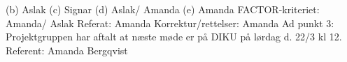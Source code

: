 \documentclass[a4paper,12pt]{article}
\begin{document}
(b) Aslak
\newline
\newline
(c) Signar 
\newline
\newline
(d) Aslak/ Amanda
\newline
\newline
(e) Amanda
\newline
\newline
FACTOR-kriteriet: Amanda/ Aslak
\newline
\newline
Referat: Amanda
\newline
\newline
Korrektur/rettelser: Amanda
\newline
\newline
Ad punkt 3: Projektgruppen har aftalt at næste møde er på DIKU på lørdag d. 22/3 kl 12. 
\newline
\newline
\newline
\newline
Referent: Amanda Bergqvist
\end{document}
